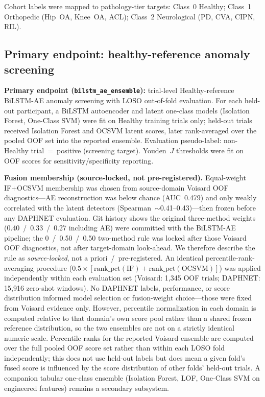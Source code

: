 \documentclass[11pt,a4paper]{article}
\begin{document}
Cohort labels were mapped to pathology-tier targets: Class~0 Healthy; Class~1 Orthopedic (Hip~OA, Knee~OA, ACL); Class~2 Neurological (PD, CVA, CIPN, RIL).

\subsection{Primary endpoint: healthy-reference anomaly screening}
\label{sec:primary}

\textbf{Primary endpoint (\texttt{bilstm\_ae\_ensemble}):} trial-level Healthy-reference BiLSTM-AE anomaly screening with LOSO out-of-fold evaluation. For each held-out participant, a BiLSTM autoencoder and latent one-class models (Isolation Forest, One-Class SVM) were fit on Healthy training trials only; held-out trials received Isolation Forest and OCSVM latent scores, later rank-averaged over the pooled OOF set into the reported ensemble. Evaluation pseudo-label: non-Healthy trial~=~positive (screening target). Youden~$J$ thresholds were fit on OOF scores for sensitivity/specificity reporting.

\textbf{Fusion membership (source-locked, not pre-registered).} Equal-weight IF+OCSVM membership was chosen from source-domain Voisard OOF diagnostics---AE reconstruction was below chance (AUC~0.479) and only weakly correlated with the latent detectors (Spearman~$\sim$0.41--0.43)---then frozen before any DAPHNET evaluation. Git history shows the original three-method weights (0.40~/~0.33~/~0.27 including AE) were committed with the BiLSTM-AE pipeline; the 0~/~0.50~/~0.50 two-method rule was locked after those Voisard OOF diagnostics, not after target-domain look-ahead. We therefore describe the rule as \emph{source-locked}, not a priori~/~pre-registered. An identical percentile-rank-averaging procedure ($0.5\times[\mathrm{rank\_pct}(\mathrm{IF})+\mathrm{rank\_pct}(\mathrm{OCSVM})]$) was applied independently within each evaluation set (Voisard: 1{,}345 OOF trials; DAPHNET: 15{,}916 zero-shot windows). No DAPHNET labels, performance, or score distribution informed model selection or fusion-weight choice---those were fixed from Voisard evidence only. However, percentile normalization in each domain is computed relative to that domain's own score pool rather than a shared frozen reference distribution, so the two ensembles are not on a strictly identical numeric scale. Percentile ranks for the reported Voisard ensemble are computed over the full pooled OOF score set rather than within each LOSO fold independently; this does not use held-out labels but does mean a given fold's fused score is influenced by the score distribution of other folds' held-out trials. A companion tabular one-class ensemble (Isolation Forest, LOF, One-Class SVM on engineered features) remains a secondary subsystem.
\end{document}
